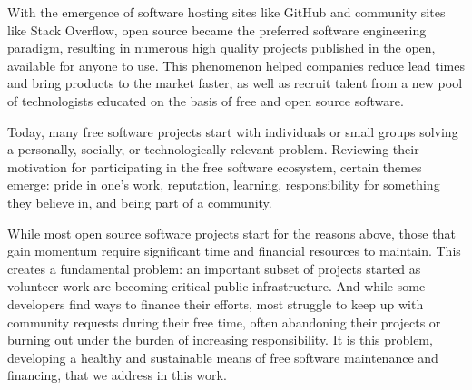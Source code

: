 With the emergence of software hosting sites like GitHub and community sites
like Stack Overflow, open source became the preferred software engineering
paradigm, resulting in numerous high quality projects published in the open,
available for anyone to use. This phenomenon helped
companies reduce lead times and bring products to the market faster, as well as
recruit talent from a new pool of technologists educated on the basis of
free and open source software.

Today, many free software projects start with individuals or small groups
solving a personally, socially, or technologically relevant problem.
Reviewing their motivation for participating in the free software ecosystem,
certain themes emerge: pride in one's work, reputation, learning,
responsibility for something they believe in, and being part of a community.

While most open source software projects start for the reasons above, those
that gain momentum require significant time and financial resources to
maintain. This creates a fundamental problem: an important subset of projects
started as volunteer work are becoming critical public
infrastructure. And while some developers find ways to finance their efforts,
most struggle to keep up with community requests during their free time, often
abandoning their projects or burning out under the burden of increasing
responsibility. It is this problem, developing a healthy and sustainable means
of free software maintenance and financing, that we address in this work.
